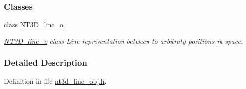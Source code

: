 \subsubsection*{Classes}
\begin{DoxyCompactItemize}
\item 
class \hyperlink{class_n_t3_d__line__o}{NT3D\_\-line\_\-o}
\begin{DoxyCompactList}\small\item\em \hyperlink{class_n_t3_d__line__o}{NT3D\_\-line\_\-o} class Line representation between to arbitraty positions in space. \item\end{DoxyCompactList}\end{DoxyCompactItemize}


\subsubsection{Detailed Description}


Definition in file \hyperlink{nt3d__line__obj_8h_source}{nt3d\_\-line\_\-obj.h}.

